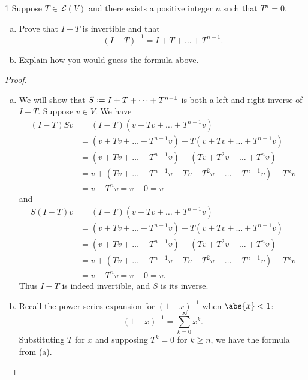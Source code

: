 \documentclass{extarticle}
\newenvironment{problem}[1]{\begin{prob*}{#1}{}}{\end{prob*}}
\newcommand{\Hom}{\mathcal{L}}
\newcommand{\defeq}{\vcentcolon=}
\begin{document}
\begin{problem}{1}
Suppose $T\in\Hom(V)$ and there exists a positive integer $n$ such that $T^n=0$.
\begin{enumerate}[(a)]
\item Prove that $I-T$ is invertible and that 
\begin{equation*}
(I - T)^{-1} = I + T + \dots + T^{n-1}.
\end{equation*}
\item Explain how you would guess the formula above.
\end{enumerate}
\end{problem}
\begin{proof}
\begin{enumerate}[(a)]
\item We will show that $S\defeq I + T + \dots + T^{n-1}$ is both a left and right inverse of $I - T$.  Suppose $v\in V$.  We have
\begin{align*}
(I - T)Sv &= (I- T)\left(v + Tv + \dots + T^{n-1}v\right)\\
&= \left(v + Tv + \dots + T^{n-1}v\right) - T\left(v + Tv + \dots + T^{n-1}v\right)\\
&= \left(v + Tv + \dots + T^{n-1}v\right) - \left(Tv + T^2v + \dots + T^nv\right)\\
&= v + \left(Tv + \dots + T^{n-1}v - Tv -T^2v - \dots - T^{n-1}v\right) - T^nv\\
&= v - T^nv = v - 0 = v 
\end{align*}
and
\begin{align*}
S(I - T)v &= (I - T)\left(v + Tv + \dots + T^{n-1}v\right)\\
&= \left(v + Tv + \dots + T^{n-1}v\right) - T\left(v + Tv + \dots + T^{n-1}v\right)\\
&= \left(v + Tv + \dots + T^{n-1}v\right) - \left(Tv + T^2v + \dots + T^nv\right)\\
&= v + \left(Tv + \dots + T^{n-1}v - Tv -T^2v - \dots - T^{n-1}v\right) - T^nv\\
&= v - T^nv = v - 0 = v.
\end{align*}
Thus $I - T$ is indeed invertible, and $S$ is its inverse.
\item Recall the power series expansion for $(1 - x)^{-1}$ when $\abs{x} < 1$:
\begin{equation*}
(1 - x)^{-1}= \sum_{k = 0}^\infty x^k.
\end{equation*}
Substituting $T$ for $x$ and supposing $T^k = 0$ for $k\geq n$, we have the formula from (a). \qedhere
\end{enumerate}
\end{proof}
\end{document}
